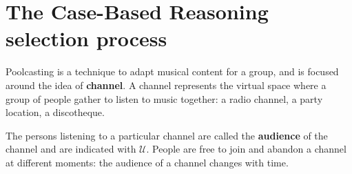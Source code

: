 








% 
% 


\section{The Case-Based Reasoning selection process} %
\label{sec:the_case_based_reasoning_selection_process}

Poolcasting is a technique to adapt musical content for a group, and is focused around the idea of \textbf{channel}.
A channel represents the virtual space where a group of people gather to listen to music together: a radio channel, a party location, a discotheque.

The persons listening to a particular channel are called the \textbf{audience} of the channel and are indicated with $\mathcal{U}$. 
People are free to join and abandon a channel at different moments: the audience of a channel changes with time. 

